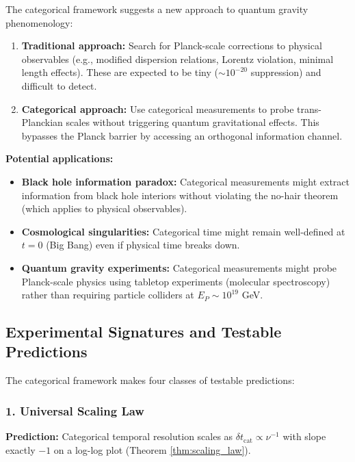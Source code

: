 \documentclass[twocolumn,10pt]{article}
\theoremstyle{remark}
\begin{document}
The categorical framework suggests a new approach to quantum gravity phenomenology:

\begin{enumerate}
    \item \textbf{Traditional approach:} Search for Planck-scale corrections to physical observables (e.g., modified dispersion relations, Lorentz violation, minimal length effects). These are expected to be tiny ($\sim 10^{-20}$ suppression) and difficult to detect.

    \item \textbf{Categorical approach:} Use categorical measurements to probe trans-Planckian scales without triggering quantum gravitational effects. This bypasses the Planck barrier by accessing an orthogonal information channel.
\end{enumerate}

\textbf{Potential applications:}
\begin{itemize}
    \item \textbf{Black hole information paradox:} Categorical measurements might extract information from black hole interiors without violating the no-hair theorem (which applies to physical observables).

    \item \textbf{Cosmological singularities:} Categorical time might remain well-defined at $t = 0$ (Big Bang) even if physical time breaks down.

    \item \textbf{Quantum gravity experiments:} Categorical measurements might probe Planck-scale physics using tabletop experiments (molecular spectroscopy) rather than requiring particle colliders at $E_P \sim 10^{19}$ GeV.
\end{itemize}

\subsection{Experimental Signatures and Testable Predictions}

The categorical framework makes four classes of testable predictions:

\subsubsection{1. Universal Scaling Law}

\textbf{Prediction:} Categorical temporal resolution scales as $\delta t_{\text{cat}} \propto \nu^{-1}$ with slope exactly $-1$ on a log-log plot (Theorem \ref{thm:scaling_law}).
\end{document}
